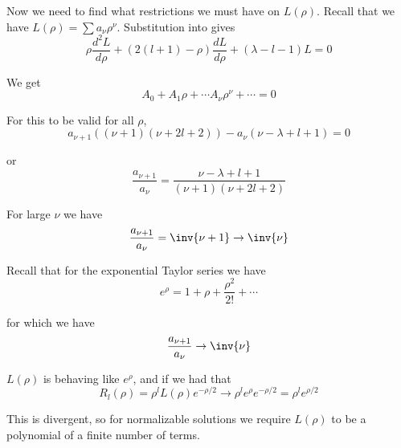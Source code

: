 Now we need to find what restrictions we must have on \(L(\rho)\).  Recall that we have \(L(\rho) = \sum a_\nu \rho^\nu\).  Substitution into  gives
%
\begin{equation}\label{eqn:PHY356FLecture10:180}
\rho \frac{d^2 L}{d\rho} + \left( 2(l+1) - \rho \right) \frac{d L}{d \rho} + (\lambda - l - 1) L = 0
\end{equation}

We get
\begin{equation}\label{eqn:PHY356FLecture10:190}
A_0 + A_1 \rho + \cdots A_\nu \rho^\nu + \cdots = 0
\end{equation}

For this to be valid for all \(\rho\),
%
\begin{equation}\label{eqn:PHY356FLecture10:200}
a_{\nu+1} \left(
(\nu+1)(\nu+ 2l + 2)
\right)
-
a_{\nu} \left(
\nu - \lambda + l + 1
\right)
=0
\end{equation}

or
\begin{equation}\label{eqn:PHY356FLecture10:210}
\frac{a_{\nu+1}}{ a_{\nu} }
=
\frac{ \nu - \lambda + l + 1 }{ (\nu+1)(\nu+ 2l + 2) }
\end{equation}

For large \(\nu\) we have
\begin{equation}\label{eqn:PHY356FLecture10:220}
\frac{a_{\nu+1}}{ a_{\nu} }
=
\inv{\nu+1}
\rightarrow \inv{\nu}
\end{equation}

Recall that for the exponential Taylor series we have
\begin{equation}\label{eqn:PHY356FLecture10:230}
e^\rho = 1 + \rho + \frac{\rho^2}{2!} + \cdots
\end{equation}

for which we have
\begin{equation}\label{eqn:PHY356FLecture10:240}
\frac{a_{\nu+1}}{a_\nu} \rightarrow \inv{\nu}
\end{equation}

\(L(\rho)\) is behaving like \(e^\rho\), and if we had that
%
\begin{equation}\label{eqn:PHY356FLecture10:250}
R_l(\rho) = \rho^l L(\rho) e^{-\rho/2} \rightarrow \rho^l e^\rho e^{-\rho/2} = \rho^l e^{\rho/2}
\end{equation}

This is divergent, so for normalizable solutions we require \(L(\rho)\) to be a polynomial of a finite number of terms.


